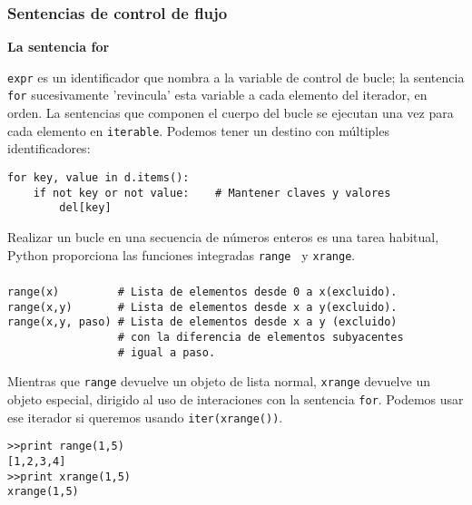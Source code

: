 \documentclass[10pt]{beamer}
\begin{document}
\begin{frame}[fragile]
\frametitle{Sentencias de control de flujo}

\textbf{La sentencia for}

\vspace{0.2cm}


\texttt{expr} es un identificador que nombra a la variable de control de bucle; la sentencia \texttt{for} sucesivamente 'revincula' esta variable a cada elemento del iterador, en orden. La sentencias que componen el cuerpo del bucle se ejecutan una vez para cada elemento en \texttt{iterable}.
Podemos tener un destino con m\'ultiples identificadores:

\vspace{0.2cm}

\begin{lstlisting}
for key, value in d.items():
    if not key or not value:    # Mantener claves y valores
        del[key]
\end{lstlisting}

\vspace{0.2cm}

Realizar un bucle en una secuencia de n\'umeros  enteros es una tarea habitual, Python proporciona las 
funciones integradas \texttt{range } y \texttt{xrange}.

\end{frame}
\begin{frame}[fragile]
\frametitle{}

\vspace{0.2cm}

\begin{lstlisting}
range(x)         # Lista de elementos desde 0 a x(excluido).
range(x,y)       # Lista de elementos desde x a y(excluido).
range(x,y, paso) # Lista de elementos desde x a y (excluido)
                 # con la diferencia de elementos subyacentes
                 # igual a paso. 
\end{lstlisting}

\vspace{0.2cm}

Mientras que \texttt{range} devuelve un objeto de lista normal, \texttt{xrange} devuelve un objeto especial, dirigido al uso de interaciones con la sentencia \texttt{for}. Podemos usar ese iterador si queremos usando \texttt{iter(xrange())}.

\vspace{0.2cm}

\begin{lstlisting}
>>print range(1,5)
[1,2,3,4]
>>print xrange(1,5)
xrange(1,5)

\end{lstlisting}
\end{frame}
\end{document}
